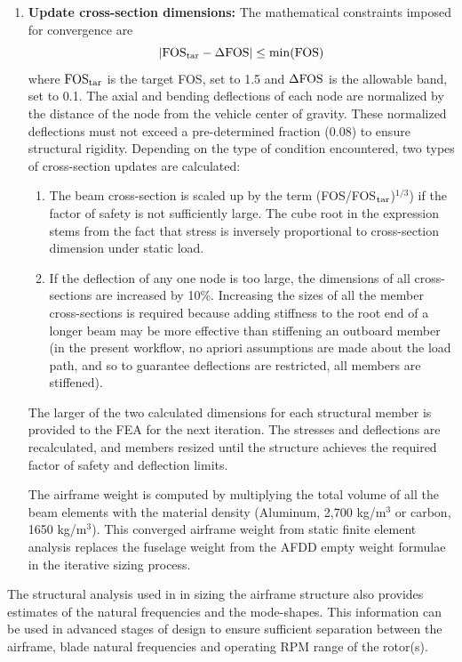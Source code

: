 \begin{enumerate}
\item {\bf Update cross-section dimensions: } The mathematical constraints imposed for convergence are
\begin{equation}
|{\rm FOS}_{\rm tar} - \Delta {\rm FOS}| \leq {\rm min}({\rm FOS})
\end{equation}
where ${\rm FOS}_{\rm tar}$ is the target FOS, set to 1.5 and $\Delta {\rm FOS}$ is the allowable band, set to 0.1. The axial and bending deflections of each node are normalized by the distance of the node from the vehicle center of gravity. These normalized deflections must not exceed a pre-determined fraction (0.08) to ensure structural rigidity. Depending on the type of condition encountered, two types of cross-section updates are calculated:
\begin{enumerate}
\item The beam cross-section is scaled up by the term (FOS/FOS$_{\rm tar}$)$^{1/3}$) if the factor of safety is not sufficiently large. The cube root in the expression stems from the fact that stress is inversely proportional to cross-section dimension under static load.
\item If the deflection of any one node is too large, the dimensions of all cross-sections are increased by 10\%. Increasing the sizes of all the member cross-sections is required because adding stiffness to the root end of a longer beam may be more effective than stiffening an outboard member (in the present workflow, no apriori assumptions are made about the load path, and so to guarantee deflections are restricted, all members are stiffened).
\end{enumerate}
The larger of the two calculated dimensions for each structural member is provided to the FEA for the next iteration. The stresses and deflections are recalculated, and members resized until the structure achieves the required factor of safety and deflection limits.

The airframe weight is computed by multiplying the total volume of all the beam elements with the material density (Aluminum, 2,700 kg/m$^3$ or carbon, 1650 kg/m$^3$). This converged airframe weight from static finite element analysis replaces the fuselage weight from the AFDD empty weight formulae in the iterative sizing process.

\end{enumerate}
The structural analysis used in in sizing the airframe structure also provides estimates of the natural frequencies and the mode-shapes. This information can be used in advanced stages of design to ensure sufficient separation between the airframe, blade natural frequencies and operating RPM range of the rotor(s). 

